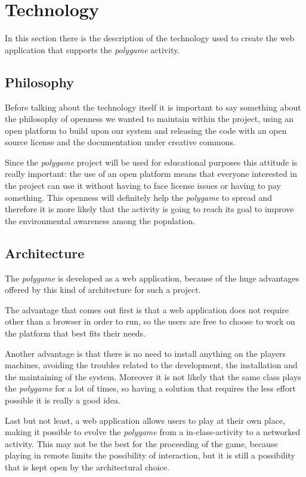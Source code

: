 \section{Technology}
In this section there is the description of the technology used to create the web application that supports the \emph{polygame} activity.

\subsection{Philosophy}
Before talking about the technology itself it is important to say something about the philosophy of openness we wanted to maintain within the project, using an open platform to build upon our system and releasing the code with an open source license and the documentation under creative commons.

Since the \emph{polygame} project will be used for educational purposes this attitude is really important: the use of an open platform means that everyone interested in the project can use it without having to face license issues or having to pay something. This openness will definitely help the \emph{polygame} to spread and therefore it is more likely that the activity is going to reach its goal to improve the environmental awareness among the population.

\subsection{Architecture}
The \emph{polygame} is developed as a web application, because of the huge advantages offered by this kind of architecture for such a project.

The advantage that comes out first is that a web application does not require other than a browser in order to run, so the users are free to choose to work on the platform that best fits their needs.

Another advantage is that there is no need to install anything on the players machines, avoiding the troubles related to the development, the installation and the maintaining of the system.
Moreover it is not likely that the same class plays the \emph{polygame} for a lot of times, so having a solution that requires the less effort possible it is really a good idea.

Last but not least, a web application allows users to play at their own place, making it possible to evolve the \emph{polygame} from a in-class-activity to a networked activity. This may not be the best for the proceeding of the game, because playing in remote limits the possibility of interaction, but it is still a possibility that is kept open by the architectural choice.

